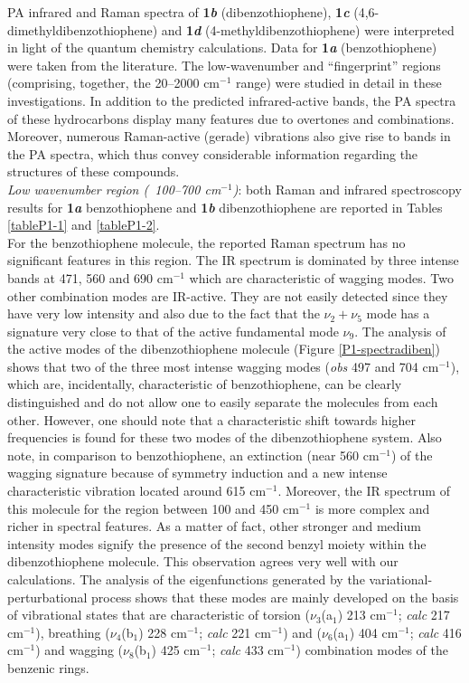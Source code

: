 	
	PA infrared and Raman spectra of \textbf{1\textit{b}} (dibenzothiophene), \textbf{1\textit{c}} (4,6-dimethyldibenzothiophene) and \textbf{1\textit{d}} (4-methyldibenzothiophene) were interpreted in light of the quantum chemistry calculations. Data for \textbf{1\textit{a}} (benzothiophene) were taken from the literature. The low-wavenumber and “fingerprint” regions (comprising, together, the 20–2000 cm$^{-1}$ range) were studied in detail in these investigations. In addition to the predicted infrared-active bands, the PA spectra of these hydrocarbons display many features due to overtones and combinations. Moreover, numerous Raman-active (gerade) vibrations also give rise to bands in the PA spectra, which thus convey considerable information regarding the structures of these compounds.\\
	
	
	\textit{Low wavenumber region (~100–700 cm$^{-1}$)}: both Raman and infrared spectroscopy results for \textbf{1\textit{a}} benzothiophene and \textbf{1\textit{b}} dibenzothiophene are reported in Tables \ref{tableP1-1} and \ref{tableP1-2}.\\
	
	
	For the benzothiophene molecule, the reported Raman spectrum has no significant features in this region. The IR spectrum is dominated by three intense bands at 471, 560 and 690 cm$^{-1}$ which are characteristic of wagging modes. Two other combination modes are IR-active. They are not easily detected since they have very low intensity and also due to the fact that the $\nu_{2}+ \nu_{5}$ mode has a signature very close to that of the active fundamental mode $\nu_{9}$. The analysis of the active modes of the dibenzothiophene molecule (Figure \ref{P1-spectradiben}) shows that two of the three most intense wagging modes (\textit{obs} 497 and 704 cm$^{-1}$), which are, incidentally, characteristic of benzothiophene, can be clearly distinguished and do not allow one to easily separate the molecules from each other. However, one should note that a characteristic shift towards higher frequencies is found for these two modes of the dibenzothiophene system. Also note, in comparison to benzothiophene, an extinction (near 560 cm$^{-1}$) of the wagging signature because of symmetry induction and a new intense characteristic vibration located around 615 cm$^{-1}$. Moreover, the IR spectrum of this molecule for the region between 100 and 450 cm$^{-1}$ is more complex and richer in spectral features. As a matter of fact, other stronger and medium intensity modes signify the presence of the second benzyl moiety within the dibenzothiophene molecule. This observation agrees very well with our calculations. The analysis of the eigenfunctions generated by the variational-perturbational process shows that these modes are mainly developed on the basis of vibrational states that are characteristic of torsion ($\nu_{3}$(a$_{1}$) 213 cm$^{-1}$; \textit{calc} 217 cm$^{-1}$), breathing ($\nu_{4}$(b$_{1}$) 228 cm$^{-1}$; \textit{calc} 221 cm$^{-1}$) and ($\nu_{6}$(a$_{1}$) 404 cm$^{-1}$; \textit{calc} 416 cm$^{-1}$) and wagging ($\nu_{8}$(b$_{1}$) 425 cm$^{-1}$; \textit{calc} 433 cm$^{-1}$) combination modes of the benzenic rings. \\
	
